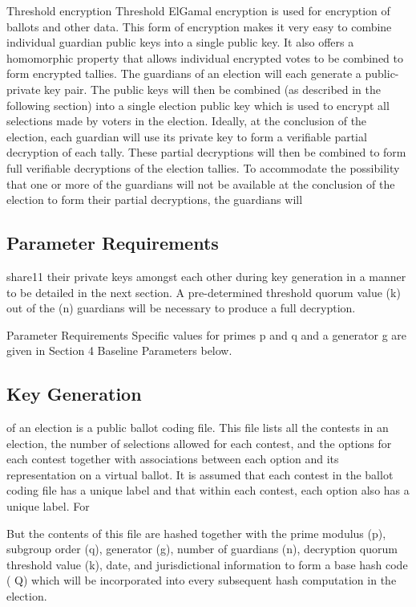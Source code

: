 Threshold encryption Threshold ElGamal encryption is used for encryption of ballots and other data. This form of
encryption makes it very easy to combine individual guardian public keys into a single public key. It also offers a
homomorphic property that allows individual encrypted votes to be combined to form encrypted tallies. The guardians of
an election will each generate a public-private key pair. The public keys will then be combined (as described in the
following section) into a single election public key which is used to encrypt all selections made by voters in the
election. Ideally, at the conclusion of the election, each guardian will use its private key to form a verifiable
partial decryption of each tally. These partial decryptions will then be combined to form full verifiable decryptions of
the election tallies. To accommodate the possibility that one or more of the guardians will not be available at the
conclusion of the election to form their partial decryptions, the guardians will
\cite[6]{eg-spec}

\subsection{Parameter Requirements}
share11 their private keys amongst each other during key generation in a manner to be detailed in the next section. A
pre-determined threshold quorum value (k) out of the (n) guardians will be necessary to produce a full decryption.
\cite[7]{eg-spec}



Parameter Requirements Specific values for primes p and q and a generator g are given in Section 4 Baseline Parameters
below.
\cite[7]{eg-spec}

\subsection{Key Generation}
of an election is a public ballot coding file. This file lists all the contests in an election, the number of selections
allowed for each contest, and the options for each contest together with associations between each option and its
representation on a virtual ballot. It is assumed that each contest in the ballot coding file has a unique label and
that within each contest, each option also has a unique label. For
\cite[8]{eg-spec}

But the contents of this file are hashed together with the prime modulus (p), subgroup order (q), generator (g), number
of guardians (n), decryption quorum threshold value (k), date, and jurisdictional information to form a base hash code (
Q) which will be incorporated into every subsequent hash computation in the election.
\cite[8]{eg-spec}




